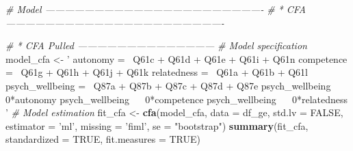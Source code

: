 \documentclass[
]{article}
\newenvironment{Shaded}{\begin{snugshade}}{\end{snugshade}}
\newcommand{\CommentTok}[1]{\textcolor[rgb]{0.56,0.35,0.01}{\textit{#1}}}
\newcommand{\DataTypeTok}[1]{\textcolor[rgb]{0.13,0.29,0.53}{#1}}
\newcommand{\KeywordTok}[1]{\textcolor[rgb]{0.13,0.29,0.53}{\textbf{#1}}}
\newcommand{\NormalTok}[1]{#1}
\newcommand{\OtherTok}[1]{\textcolor[rgb]{0.56,0.35,0.01}{#1}}
\newcommand{\StringTok}[1]{\textcolor[rgb]{0.31,0.60,0.02}{#1}}
\begin{document}
\begin{Shaded}
\begin{Highlighting}[]
\CommentTok{# Model -------------------------------------------------------------------}
\CommentTok{# * CFA -------------------------------------------------------------------}


\CommentTok{# * CFA Pulled  ------------------------------------------}
\CommentTok{# Model specification}
\NormalTok{model_cfa <-}\StringTok{ '}
\StringTok{autonomy =~ Q61c + Q61d + Q61e + Q61i + Q61n}
\StringTok{competence =~ Q61g + Q61h + Q61j + Q61k}
\StringTok{relatedness =~ Q61a + Q61b + Q61l}
\StringTok{psych_wellbeing =~ Q87a + Q87b + Q87c + Q87d + Q87e}
\StringTok{psych_wellbeing ~~ 0*autonomy}
\StringTok{psych_wellbeing ~~ 0*competence}
\StringTok{psych_wellbeing ~~ 0*relatedness}
\StringTok{'}
\CommentTok{# Model estimation}
\NormalTok{fit_cfa <-}\StringTok{ }\KeywordTok{cfa}\NormalTok{(model_cfa,}
                  \DataTypeTok{data =}\NormalTok{ df_ge,}
                  \DataTypeTok{std.lv =} \OtherTok{FALSE}\NormalTok{,}
                  \DataTypeTok{estimator =} \StringTok{'ml'}\NormalTok{,}
                  \DataTypeTok{missing =} \StringTok{'fiml'}\NormalTok{,}
                  \DataTypeTok{se =} \StringTok{"bootstrap"}\NormalTok{)}
\KeywordTok{summary}\NormalTok{(fit_cfa,}
        \DataTypeTok{standardized =} \OtherTok{TRUE}\NormalTok{,}
        \DataTypeTok{fit.measures =} \OtherTok{TRUE}\NormalTok{)}
\end{Highlighting}
\end{Shaded}
\end{document}
